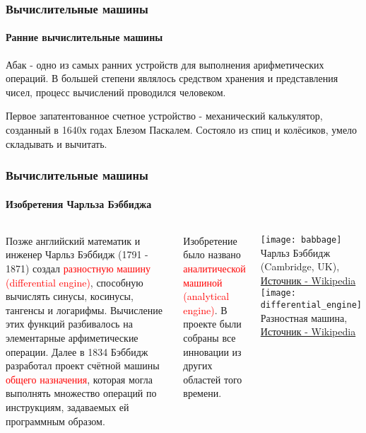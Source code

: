\documentclass[aspectratio=169]{beamer}
\begin{document}
\begin{frame}
\frametitle{Вычислительные машины}
\framesubtitle{Ранние вычислительные машины}
\justifying
Абак - одно из самых ранних устройств для выполнения арифметических операций. В большей степени являлось средством хранения и представления чисел, процесс вычислений проводился человеком. \newline

Первое запатентованное счетное устройство - механический калькулятор, созданный в 1640х годах Блезом Паскалем.
Состояло из спиц и колёсиков, умело складывать и вычитать.

\begin{figure}

    \captionsetup[subfigure]{labelformat=empty}
    \centering
\end{figure}

\end{frame}


\begin{frame}
\frametitle{Вычислительные машины}
\framesubtitle{Изобретения Чарльза Бэббиджа}
\begin{block}{}
\begin{columns}[]
\column{\dimexpr\linewidth-30mm}
\justifying
Позже английский математик и инженер Чарльз Бэббидж (1791 - 1871) создал \textcolor{red}{разностную машину (differential engine)}, способную вычислять синусы, косинусы, тангенсы и логарифмы. Вычисление этих функций разбивалось на элементарные арфиметические операции.\newline\newline
Далее в 1834 Бэббидж разработал проект счётной машины \textcolor{red}{общего назначения}, которая могла выполнять множество операций по инструкциям, задаваемых ей программным образом. \newline

Изобретение было названо \textcolor{red}{аналитической машиной (analytical engine)}. В проекте были собраны все инновации из других областей того времени.

\column{30mm}

\texttt{[image: babbage]}
\tiny Чарльз Бэббидж (Cambridge, UK), \href{https://en.wikipedia.org/wiki/Charles_Babbage}{Источник - Wikipedia} 
\newline\newline
\texttt{[image: differential\_engine]}\newline
\tiny Разностная машина, \href{https://en.wikipedia.org/wiki/Charles_Babbage}{Источник - Wikipedia} 

\end{columns}
\end{block}
\end{frame}
\end{document}
